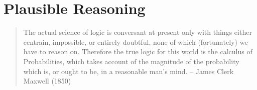 \chapter{Plausible Reasoning}

\begin{quotation}
    The actual science of logic is conversant at present only with things either centrain,
    impossible, or entirely doubtful, none of which (fortunately) we have to reason on.
    Therefore the true logic for this world is the calculus of Probabilities, which takes
    account of the magnitude of the probability which is, or ought to be, in a reasonable
    man's mind.
    \hfill -- James Clerk Maxwell (1850)
\end{quotation}
